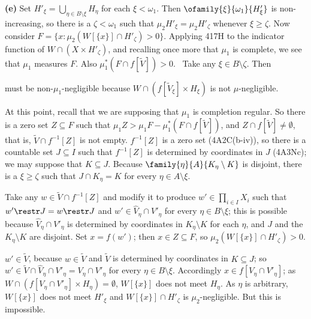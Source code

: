 {\medskip

{\bf (e)} Set $H'_{\xi}=\bigcup_{\eta\in B\setminus\xi}H_{\eta}$ for
each $\xi<\omega_1$.   Then $\ofamily{\xi}{\omega_1}{H'_{\xi}}$ is
non-increasing, so there is a $\zeta<\omega_1$ such that
$\mu_2H'_{\xi}=\mu_2H'_{\zeta}$ whenever $\xi\ge\zeta$.   Now consider
$F=\{x:\mu_2(W[\{x\}]\cap H'_{\zeta})>0\}$.   Applying 417H to
the indicator function of $W\cap(X\times H'_{\zeta})$, and
recalling once more that $\mu_1$ is complete, we see that $\mu_1$
measures $F$.   Also $\mu_1^*(F\cap f[\tilde V])>0$.   \Prf\ Take any
$\xi\in B\setminus\zeta$.   Then


\noindent must be non-$\mu_1$-negligible because
$W\cap(f[\tilde V_{\xi}]\times H_{\xi})$ is not $\mu$-negligible.\ \Qed

At this point, recall that we are supposing that $\mu_1$ is completion
regular.   So there is a zero set $Z\subseteq F$ such that
$\mu_1Z>\mu_1F-\mu_1^*(F\cap f[\tilde V])$, and
$Z\cap f[\tilde V]\ne\emptyset$, that is, $\tilde V\cap f^{-1}[Z]$ is
not empty.   $f^{-1}[Z]$ is a zero set (4A2C(b-iv)), so there is a
countable set $J\subseteq I$ such that $f^{-1}[Z]$ is determined by
coordinates in $J$ (4A3Nc);  we may suppose that $K\subseteq J$.
Because $\family{\eta}{A}{K_{\eta}\setminus K}$ is disjoint, there is a
$\xi\ge\zeta$ such that $J\cap K_{\eta}=K$ for every
$\eta\in A\setminus\xi$.

Take any $w\in\tilde V\cap f^{-1}[Z]$ and modify it to produce
$w'\in\prod_{i\in I}X_i$ such that $w'\restr J=w\restr J$ and
$w'\in\hat V_{\eta}\cap V'_{\eta}$ for every $\eta\in B\setminus\xi$;
this is possible because $\hat V_{\eta}\cap V'_{\eta}$ is determined by
coordinates in $K_{\eta}\setminus K$ for each $\eta$, and $J$ and the
$K_{\eta}\setminus K$ are disjoint.
Set $x=f(w')$;  then $x\in Z\subseteq F$, so
$\mu_2(W[\{x\}]\cap H'_{\zeta})>0$.

$w'\in\tilde V$, because $w\in\tilde V$
and $\tilde V$ is determined by coordinates in $K\subseteq J$;  so
$w'\in\tilde V\cap\hat V_{\eta}\cap V'_{\eta}=V_{\eta}\cap V'_{\eta}$ for
every $\eta\in B\setminus\xi$.
Accordingly $x\in f[V_{\eta}\cap V'_{\eta}]$;  as
$W\cap(f[V_{\eta}\cap V'_{\eta}]\times H_{\eta})=\emptyset$,
$W[\{x\}]$ does not meet $H_{\eta}$.   As $\eta$ is arbitrary,
$W[\{x\}]$ does not meet $H'_{\xi}$ and $W[\{x\}]\cap H'_{\zeta}$ is
$\mu_2$-negligible.   But this is impossible.\ \Bang

}
